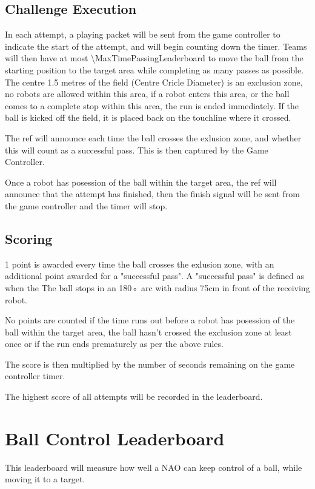 \subsection{Challenge Execution}
In each attempt, a playing packet will be sent from the game controller to indicate the start of the attempt,
and will begin counting down the timer.
Teams will then have at most \qty{\MaxTimePassingLeaderboard}{\sec} to move the ball from the starting
position to the target area while completing as many passes as possible. The centre
1.5 metres of the field (Centre Cricle Diameter) is an exclusion zone, no robots are allowed within this area,
if a robot enters this area, or the ball comes to a complete stop
within this area, the run is ended immediately. If the ball is kicked off the field,
it is placed back on the touchline where it crossed.

The ref will announce each time the ball crosses the exlusion zone, and whether this will
count as a successful pass. This is then captured by the Game Controller.

Once a robot has posession of the ball within the target area, the ref will announce that the
attempt has finished, then the finish signal will be sent from the game controller and the timer will stop.


\subsection{Scoring}
1 point is awarded every time the ball crosses the exlusion zone,
with an additional point awarded for a "successful pass". A "successful pass" is defined as when the
The ball stops in an 180◦ arc with radius 75cm in front of the receiving robot.

No points are counted if the time runs out before a robot has posession of the ball
within the target area, the ball hasn't crossed the exclusion zone at least once
or if the run ends prematurely as per the above rules.

The score is then multiplied by the number of seconds remaining on the game controller timer.

The highest score of all attempts will be recorded in the leaderboard.

\section{Ball Control Leaderboard}
This leaderboard will measure how well a NAO can keep control of a ball, while moving it
to a target.

